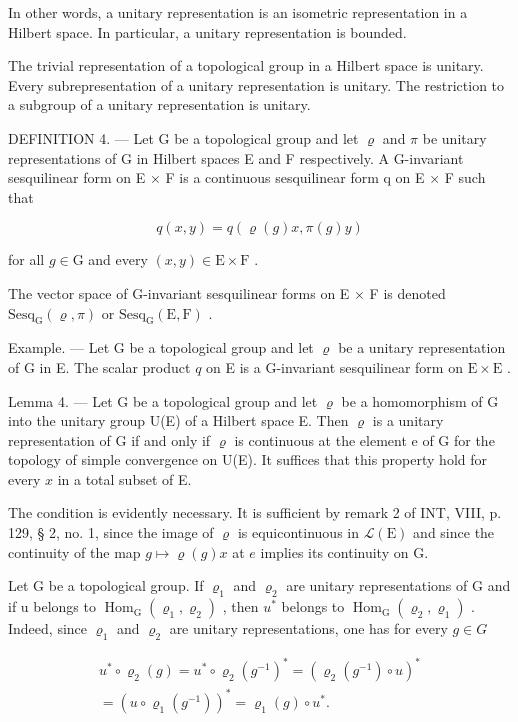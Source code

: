 In other words, a unitary representation is an isometric representation in a Hilbert space. In particular, a unitary representation is bounded.

The trivial representation of a topological group in a Hilbert space is unitary. Every subrepresentation of a unitary representation is unitary. The restriction to a subgroup of a unitary representation is unitary.

DEFINITION 4. --- Let G be a topological group and let \(\varrho\) and \(\pi\) be unitary representations of G in Hilbert spaces E and F respectively. A G-invariant sesquilinear form on E × F is a continuous sesquilinear form q on E × F such that

\[
q (x, y) = q (\varrho (g) x, \pi (g) y)
\]

for all \(g \in \mathrm{G}\) and every \((x, y) \in \mathrm{E} \times \mathrm{F}\) .

The vector space of G-invariant sesquilinear forms on E × F is denoted \(\mathrm{Sesq}_{\mathrm{G}}(\varrho,\pi)\) or \(\mathrm{Sesq}_{\mathrm{G}}(\mathrm{E},\mathrm{F})\) .

Example. --- Let G be a topological group and let \(\varrho\) be a unitary representation of G in E. The scalar product \(q\) on E is a G-invariant sesquilinear form on \(\mathrm{E} \times \mathrm{E}\) .

Lemma 4. --- Let G be a topological group and let \(\varrho\) be a homomorphism of G into the unitary group U(E) of a Hilbert space E. Then \(\varrho\) is a unitary representation of G if and only if \(\varrho\) is continuous at the element e of G for the topology of simple convergence on U(E). It suffices that this property hold for every \(x\) in a total subset of E.

The condition is evidently necessary. It is sufficient by remark 2 of INT, VIII, p. 129, § 2, no. 1, since the image of \(\varrho\) is equicontinuous in \(\mathcal{L}(\mathrm{E})\) and since the continuity of the map \(g \mapsto \varrho(g)x\) at \(e\) implies its continuity on G.

Let G be a topological group. If \(\varrho_{1}\) and \(\varrho_{2}\) are unitary representations of G and if u belongs to \(\operatorname{Hom}_{\mathrm{G}}(\varrho_{1},\varrho_{2})\) , then \(u^{*}\) belongs to \(\operatorname{Hom}_{\mathrm{G}}(\varrho_{2},\varrho_{1})\) . Indeed, since \(\varrho_{1}\) and \(\varrho_{2}\) are unitary representations, one has for every \(g\in G\)

\[
\begin{array}{r} u ^ {*} \circ \varrho_ {2} (g) = u ^ {*} \circ \varrho_ {2} (g ^ {- 1}) ^ {*} = (\varrho_ {2} (g ^ {- 1}) \circ u) ^ {*} \\ = (u \circ \varrho_ {1} (g ^ {- 1})) ^ {*} = \varrho_ {1} (g) \circ u ^ {*}. \end{array}
\]

